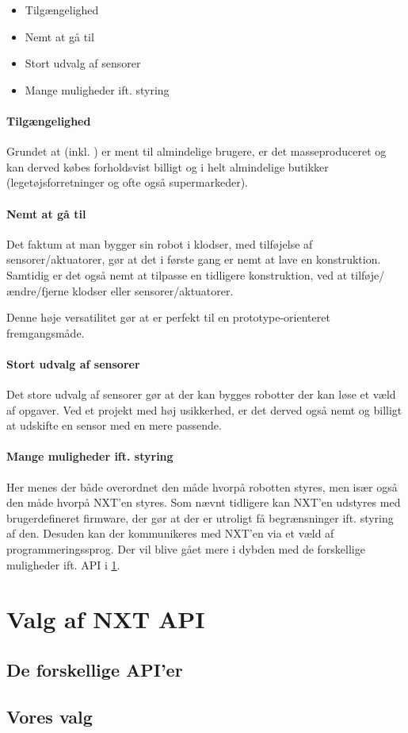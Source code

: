 \begin{itemize}
\item{Tilgængelighed}
\item{Nemt at gå til}
\item{Stort udvalg af sensorer}
\item{Mange muligheder ift. styring}
\end{itemize}

\paragraph{Tilgængelighed}
Grundet at \lego (inkl. \legoms) er ment til almindelige brugere, er det masseproduceret og kan derved købes forholdsvist billigt og i helt almindelige butikker (legetøjsforretninger og ofte også supermarkeder).

\paragraph{Nemt at gå til}
Det faktum at man bygger sin robot i \lego klodser, med tilføjelse af \legoms sensorer/aktuatorer, gør at det i første gang er nemt at lave en konstruktion.
Samtidig er det også nemt at tilpasse en tidligere konstruktion, ved at tilføje/ændre/fjerne klodser eller sensorer/aktuatorer.

Denne høje versatilitet gør at \lego er perfekt til en prototype-orienteret fremgangsmåde.

\paragraph{Stort udvalg af sensorer}
Det store udvalg af sensorer gør at der kan bygges robotter der kan løse et væld af opgaver.
Ved et projekt med høj usikkerhed, er det derved også nemt og billigt at udskifte en sensor med en mere passende.

\paragraph{Mange muligheder ift. styring}
Her menes der både overordnet den måde hvorpå robotten styres, men især også den måde hvorpå NXT'en styres.
Som nævnt tidligere kan NXT'en udstyres med brugerdefineret firmware, der gør at der er utroligt få begrænsninger ift. styring af den.
Desuden kan der kommunikeres med NXT'en via et væld af programmeringssprog.
Der vil blive gået mere i dybden med de forskellige muligheder ift. API i \cref{nxt_api}.


\section{Valg af NXT API}
\label{nxt_api}

\subsection{De forskellige API'er}

\subsection{Vores valg}
